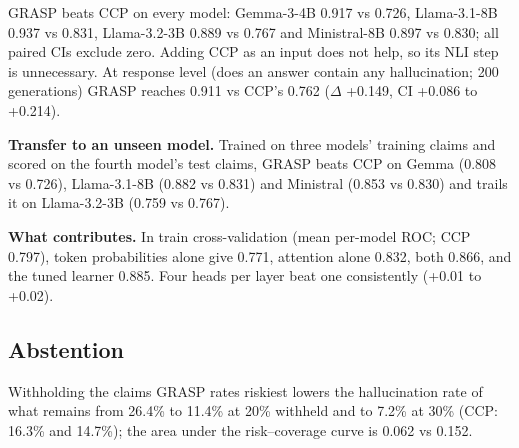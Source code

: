 \documentclass[11pt]{article}
\begin{document}
GRASP beats CCP on every model: Gemma-3-4B 0.917 vs 0.726, Llama-3.1-8B 0.937 vs 0.831,
Llama-3.2-3B 0.889 vs 0.767 and Ministral-8B 0.897 vs 0.830; all paired CIs exclude zero. Adding CCP
as an input does not help, so its NLI step is unnecessary. At response level (does an answer contain
any hallucination; 200 generations) GRASP reaches 0.911 vs CCP's 0.762 ($\Delta$ +0.149,
CI +0.086 to +0.214).

\textbf{Transfer to an unseen model.} Trained on three models' training claims and scored on the
fourth model's test claims, GRASP beats CCP on Gemma (0.808 vs 0.726), Llama-3.1-8B (0.882 vs 0.831)
and Ministral (0.853 vs 0.830) and trails it on Llama-3.2-3B (0.759 vs 0.767).

\textbf{What contributes.} In train cross-validation (mean per-model ROC; CCP 0.797), token
probabilities alone give 0.771, attention alone 0.832, both 0.866, and the tuned learner 0.885.
Four heads per layer beat one consistently (+0.01 to +0.02).

\subsection{Abstention}
Withholding the claims GRASP rates riskiest lowers the hallucination rate of what remains from
26.4\% to 11.4\% at 20\% withheld and to 7.2\% at 30\% (CCP: 16.3\% and 14.7\%); the area under
the risk--coverage curve is 0.062 vs 0.152.
\end{document}
